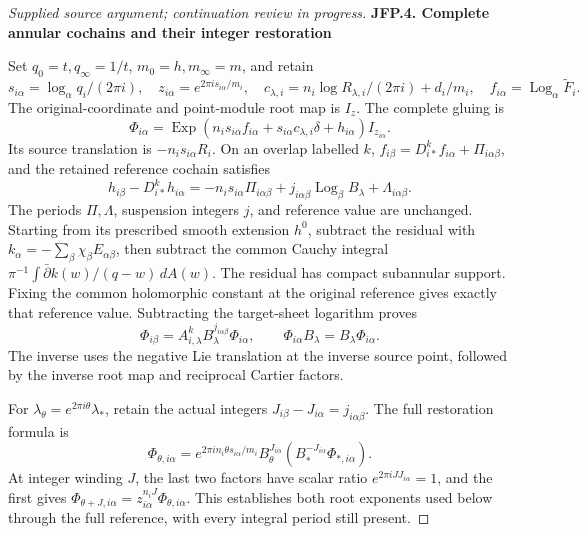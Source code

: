 \begin{proof}[Supplied source argument; continuation review in progress]
\par

\medskip\noindent\textbf{JFP.4. Complete annular cochains and their integer restoration}

\par\nobreak

Set \(q_0=t,q_\infty=1/t\), \(m_0=h,m_\infty=m\), and retain
\[
 s_{i\alpha}=\log_\alpha q_i/(2\pi i),\quad
 z_{i\alpha}=e^{2\pi i s_{i\alpha}/m_i},\quad
 c_{\lambda,i}=n_i\log R_{\lambda,i}/(2\pi i)+d_i/m_i,
 \quad f_{i\alpha}=\operatorname{Log}_\alpha\widetilde F_i.
\tag{JFP.21}
\]
The original-coordinate and point-module root map is \(I_z\).
The complete gluing is
\[
 \Phi_{i\alpha}=\operatorname{Exp}
 (n_i s_{i\alpha}f_{i\alpha}+s_{i\alpha}c_{\lambda,i}\delta
       +h_{i\alpha})I_{z_{i\alpha}}.
\tag{JFP.22}
\]
Its source translation is \(-n_i s_{i\alpha}R_i\). On an
overlap labelled \(k\),
\(f_{i\beta}=D_{i*}^kf_{i\alpha}+\Pi_{i\alpha\beta}\), and
the retained reference cochain satisfies
\[
 h_{i\beta}-D_{i*}^kh_{i\alpha}
 =-n_i s_{i\alpha}\Pi_{i\alpha\beta}
   +j_{i\alpha\beta}\operatorname{Log}_\beta B_\lambda
   +\Lambda_{i\alpha\beta}.
\tag{JFP.23}
\]
The periods \(\Pi,\Lambda\), suspension integers \(j\), and
reference value are unchanged. Starting from its prescribed smooth
extension \(h^0\), subtract the residual with
\(k_\alpha=-\sum_\beta\chi_\beta E_{\alpha\beta}\), then
subtract the common Cauchy integral
\(\pi^{-1}\int\bar\partial k(w)/(q-w)\,dA(w)\).
The residual has compact subannular support. Fixing the common
holomorphic constant at the original reference gives exactly that
reference value. Subtracting the target-sheet logarithm proves
\[
 \Phi_{i\beta}=A_{i,\lambda}^{k}B_\lambda^{j_{i\alpha\beta}}
 \Phi_{i\alpha},\qquad \Phi_{i\alpha}B_\lambda=B_\lambda\Phi_{i\alpha}.
\tag{JFP.24}
\]
The inverse uses the negative Lie translation at the inverse
source point, followed by the inverse root map and reciprocal
Cartier factors.

For \(\lambda_\theta=e^{2\pi i\theta}\lambda_*\), retain the
actual integers \(J_{i\beta}-J_{i\alpha}=j_{i\alpha\beta}\).
The full restoration formula is
\[
 \Phi_{\theta,i\alpha}
 =e^{2\pi i n_i\theta s_{i\alpha}/m_i}
 B_\theta^{J_{i\alpha}}
 (B_*^{-J_{i\alpha}}\Phi_{*,i\alpha}).
\tag{JFP.25}
\]
At integer winding \(J\), the last two factors have scalar ratio
\(e^{2\pi iJ J_{i\alpha}}=1\), and the first gives
\(\Phi_{\theta+J,i\alpha}=z_{i\alpha}^{n_iJ}\Phi_{\theta,i\alpha}\).
This establishes both root exponents used below through the full
reference, with every integral period still present.


\end{proof}
